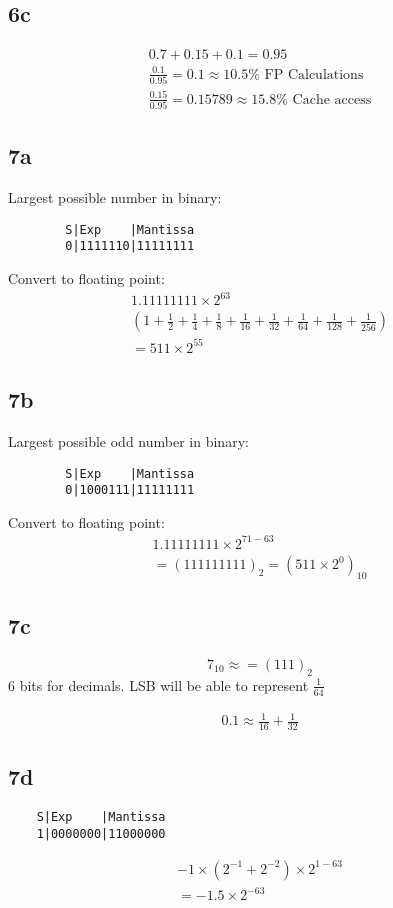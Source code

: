 \documentclass{article}
\begin{document}
\begin{multicols}{2}
    \subsection*{6c}
    \begin{gather*}
        0.7 + 0.15 + 0.1 = 0.95\\
        \frac{0.1}{0.95} = 0.1 \approx 10.5\% \text{ FP Calculations} \\
        \frac{0.15}{0.95} = 0.15789 \approx 15.8\% \text{ Cache access}
    \end{gather*}
    \subsection*{7a}
    Largest possible number in binary:
    \begin{verbatim}
        S|Exp    |Mantissa
        0|1111110|11111111
    \end{verbatim}
    Convert to floating point:
    \begin{gather*}
        1.11111111 \times 2^{63}\\
        \left( 1 + \frac{1}{2} + \frac{1}{4}+ \frac{1}{8}+ \frac{1}{16}+ \frac{1}{32}+ \frac{1}{64}+ \frac{1}{128}+ \frac{1}{256} \right)\\
        = 511 \times2^{55}
    \end{gather*}
    \subsection*{7b}
    Largest possible odd number in binary:
    \begin{verbatim}
        S|Exp    |Mantissa
        0|1000111|11111111
    \end{verbatim}
    Convert to floating point:
    \begin{gather*}
        1.11111111 \times 2^{71-63}\\
        = {(111111111)}_2 = {(511\times2^{0})}_{10}
    \end{gather*}
    \subsection*{7c}
    \[
        7_{10} \approx = {(111)}_2
    \]
    6 bits for decimals. LSB will be able to represent \(\frac{1}{64}\)

    \begin{gather*}
        0.1 \approx \frac{1}{16} + \frac{1}{32}
    \end{gather*}
    \subsection*{7d}
    \begin{verbatim}
    S|Exp    |Mantissa
    1|0000000|11000000
    \end{verbatim}
    \begin{gather*}
        -1 \times (2^{-1} + 2^{-2}) \times 2^{1-63}\\
        = -1.5 \times2^{-63}
    \end{gather*}

\end{multicols}
\end{document}
